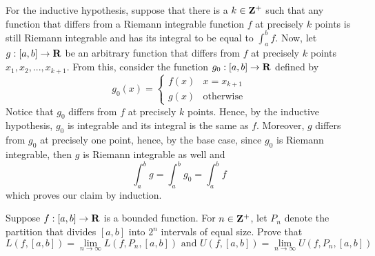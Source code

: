 \begin{solution}
    For the inductive hypothesis, suppose that there is a $k \in \mathbf{Z}^+$ such that any function that differs from a Riemann integrable function $f$ at precisely $k$ points is still Riemann integrable and has its integral to be equal to $\int_{a}^{b}f$. Now, let $g : [a,b] \to \mathbf{R}$ be an arbitrary function that differs from $f$ at precisely $k$ points $x_1, x_2, ..., x_{k+1}$. From this, consider the function $g_0 : [a,b] \to \mathbf{R}$ defined by
    $$g_0(x) = \begin{cases}
        f(x) & x = x_{k+1} \\
        g(x) & \text{otherwise}
    \end{cases}$$
    Notice that $g_0$ differs from $f$ at precisely $k$ points. Hence, by the inductive hypothesis, $g_0$ is integrable and its integral is the same as $f$. Moreover, $g$ differs from $g_0$ at precisely one point, hence, by the base case, since $g_0$ is Riemann integrable, then $g$ is Riemann integrable as well and 
    $$\int_{a}^{b}g = \int_{a}^{b}g_0 = \int_{a}^{b}f$$
    which proves our claim by induction.\\
\end{solution}

\begin{exercise}
    Suppose $f : [a,b] \to \mathbf{R}$ is a bounded function. For $n \in \mathbf{Z}^+$, let $P_n$ denote the partition that divides $[a,b]$ into $2^n$ intervals of equal size. Prove that 
    $$L(f, [a,b]) = \lim_{n \rightarrow \infty}L(f, P_n, [a,b]) \text{ and } U(f, [a,b]) = \lim_{n \rightarrow \infty}U(f, P_n, [a,b])$$
\end{exercise}

